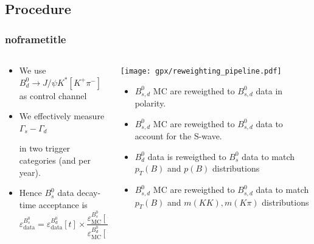 \documentclass[aspectratio=169,9pt,handout]{beamer}
\begin{document}
\subsection{Procedure}
\begin{frame}[default] %
\frametitle{noframetitle}

\begin{columns}[T]
  \begin{column}{0.5\textwidth}
    \begin{itemize}
      \item We use $B_d^0 \rightarrow J/\psi K^* [K^+ \pi^-]$ as control channel
      \item We effectively measure $\Gamma_s - \Gamma_d$ 
       in two trigger categories (and per year).
      \item Hence $B_s^0$ data decay-time acceptance is 
      $$ \varepsilon_{\text{data}}^{B_s^0} = \varepsilon_{\text{data}}^{B_d^0}[t] \times \frac{ \varepsilon_{\text{MC}}^{B_s^0}[t] }{ \varepsilon_{\text{MC}}^{B_d^0}[t] }.$$
    \end{itemize}
  \end{column}
  
  \begin{column}{0.5\textwidth}
    \vspace*{-2mm}
    \texttt{[image: gpx/reweighting\_pipeline.pdf]}
    \vspace*{-2mm}
      \begin{itemize}
        \item $B_{s,d}^0$ MC are reweigthed to $B_{s,d}^0$ data in polarity.
        \item $B_{s,d}^0$ MC are reweigthed to $B_{s,d}^0$ data to account for the S-wave.
        \item $B_{d}^0$ data is reweigthed to $B_{s}^0$ data to match $p_T(B)$ and $p(B)$ distributions
        \item $B_{s,d}^0$ MC are reweigthed to $B_{s,d}^0$ data to match $p_T(B)$ and $m(KK),m(K\pi)$ distributions
      \end{itemize}
    \end{column}
\end{columns}


\end{frame}
\end{document}
